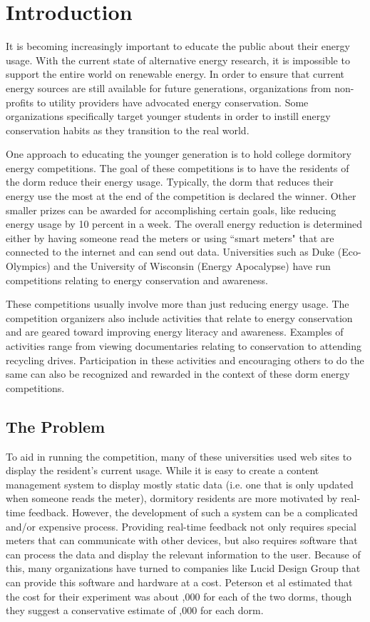 \chapter{Introduction}
It is becoming increasingly important to educate the public about their energy usage.  With the current state of alternative energy research, it is impossible to support the entire world on renewable energy.  In order to ensure that current energy sources are still available for future generations, organizations from non-profits to utility providers have advocated energy conservation.  Some organizations specifically target younger students in order to instill energy conservation habits as they transition to the real world.

One approach to educating the younger generation is to hold college dormitory energy competitions.  The goal of these competitions is to have the residents of the dorm reduce their energy usage.  Typically, the dorm that reduces their energy use the most at the end of the competition is declared the winner.  Other smaller prizes can be awarded for accomplishing certain goals, like reducing energy usage by 10 percent in a week.  The overall energy reduction is determined either by having someone read the meters or using ``smart meters" that are connected to the internet and can send out data.  Universities such as Duke (Eco-Olympics) and the University of Wisconsin (Energy Apocalypse) have run competitions relating to energy conservation and awareness. 

These competitions usually involve more than just reducing energy usage.  The competition organizers also include activities that relate to energy conservation and are geared toward improving energy literacy and awareness.  Examples of activities range from viewing documentaries relating to conservation to attending recycling drives.  Participation in these activities and encouraging others to do the same can also be recognized and rewarded in the context of these dorm energy competitions.

\section{The Problem}

To aid in running the competition, many of these universities used web sites to display the resident's current usage.  While it is easy to create a content management system to display mostly static data (i.e. one that is only updated when someone reads the meter), dormitory residents are more motivated by real-time feedback\cite{oberlin-feedback}.  However, the development of such a system can be a complicated and/or expensive process.  Providing real-time feedback not only requires special meters that can communicate with other devices, but also requires software that can process the data and display the relevant information to the user.  Because of this, many organizations have turned to companies like Lucid Design Group that can provide this software and hardware at a cost.  Peterson et al estimated that the cost for their experiment was about ,000 for each of the two dorms, though they suggest a conservative estimate of ,000 for each dorm.

